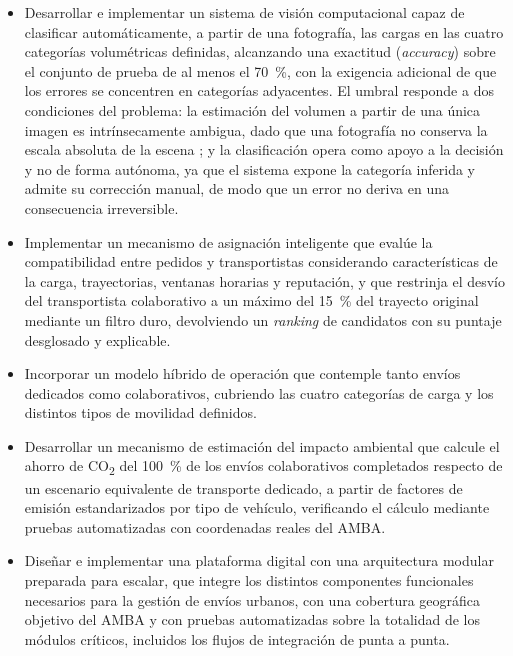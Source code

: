 {\color{nuevo}
\begin{itemize}[leftmargin=2em]
    \item Desarrollar e implementar un sistema de visión computacional capaz de clasificar automáticamente, a partir de una fotografía, las cargas en las cuatro categorías volumétricas definidas, alcanzando una exactitud (\emph{accuracy}) sobre el conjunto de prueba de al menos el 70~\%, con la exigencia adicional de que los errores se concentren en categorías adyacentes. El umbral responde a dos condiciones del problema: la estimación del volumen a partir de una única imagen es intrínsecamente ambigua, dado que una fotografía no conserva la escala absoluta de la escena \parencite{NaumannEtAl2023}; y la clasificación opera como apoyo a la decisión y no de forma autónoma, ya que el sistema expone la categoría inferida y admite su corrección manual, de modo que un error no deriva en una consecuencia irreversible.

    \item Implementar un mecanismo de asignación inteligente que evalúe la compatibilidad entre pedidos y transportistas considerando características de la carga, trayectorias, ventanas horarias y reputación, y que restrinja el desvío del transportista colaborativo a un máximo del 15~\% del trayecto original mediante un filtro duro, devolviendo un \emph{ranking} de candidatos con su puntaje desglosado y explicable.

    \item Incorporar un modelo híbrido de operación que contemple tanto envíos dedicados como colaborativos, cubriendo las cuatro categorías de carga y los distintos tipos de movilidad definidos.

    \item Desarrollar un mecanismo de estimación del impacto ambiental que calcule el ahorro de CO\textsubscript{2} del 100~\% de los envíos colaborativos completados respecto de un escenario equivalente de transporte dedicado, a partir de factores de emisión estandarizados por tipo de vehículo, verificando el cálculo mediante pruebas automatizadas con coordenadas reales del AMBA.

    \item Diseñar e implementar una plataforma digital con una arquitectura modular preparada para escalar, que integre los distintos componentes funcionales necesarios para la gestión de envíos urbanos, con una cobertura geográfica objetivo del AMBA y con pruebas automatizadas sobre la totalidad de los módulos críticos, incluidos los flujos de integración de punta a punta.
\end{itemize}
}

